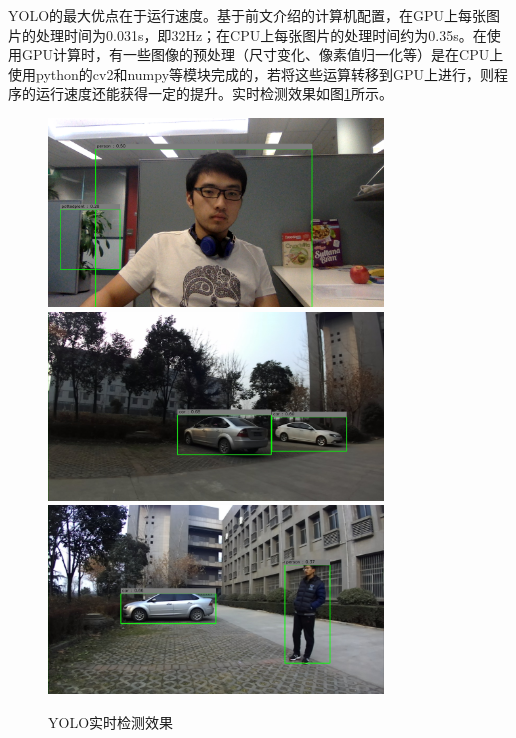 YOLO的最大优点在于运行速度。基于前文介绍的计算机配置，在GPU上每张图片的处理时间为0.031s，即32Hz；在CPU上每张图片的处理时间约为0.35s。在使用GPU计算时，有一些图像的预处理（尺寸变化、像素值归一化等）是在CPU上使用python的cv2和numpy等模块完成的，若将这些运算转移到GPU上进行，则程序的运行速度还能获得一定的提升。实时检测效果如图\ref{fig:3_3_实时检测效果}所示。
\begin{figure}[htbp] %
	\centering
	\includegraphics[width=3.5in]{figures/3_3_realtime_detection}
	\includegraphics[width=3.5in]{figures/3_3_realtime_detection2}
	\includegraphics[width=3.5in]{figures/3_3_realtime_detection3}
	\caption{YOLO实时检测效果}\label{fig:3_3_实时检测效果}
\end{figure}

